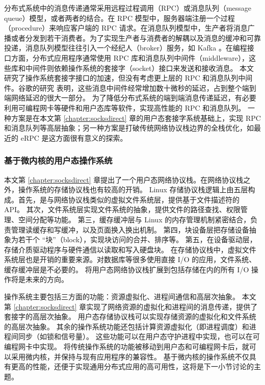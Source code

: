 分布式系统中的消息传递通常采用远程过程调用（RPC）或消息队列（message queue）模型，或者两者的结合。在 RPC 模型中，服务器端注册一个过程（procedure）来响应客户端的 RPC 请求。在消息队列模型中，生产者将消息广播或者分发到若干消费者。为了实现生产者与消费者的解耦以及消息的缓冲和可靠投递，消息队列模型往往引入一个经纪人（broker）服务，如 Kafka \cite{kreps2011kafka}。在编程接口方面，分布式应用程序通常使用 RPC 库和消息队列中间件（middleware），这些库和中间件则依赖操作系统的套接字（socket）接口来发送和接收消息。
本文研究了操作系统套接字接口的加速，但没有考虑更上层的 RPC 和消息队列中间件。谷歌的研究 \cite{barroso2017attack} 表明，这些消息中间件经常增加数十微秒的延迟，占到整个端到端网络延迟的很大一部分。
为了降低分布式系统的端到端消息传递延迟，有必要利用可编程网卡等硬件和用户态库等软件，实现高性能的 RPC 和消息队列。
一种方案是在本文第 \ref{chapter:socksdirect} 章的用户态套接字系统基础上，实现 RPC 和消息队列等高层抽象；另一种方案是打破传统网络协议栈边界的全栈优化，如最近的 eRPC \cite{kalia2018datacenter} 是这方面很有意义的探索。

\subsubsection{基于微内核的用户态操作系统}
\label{future:user-space-os}

本文第 \ref{chapter:socksdirect} 章提出了一个用户态网络协议栈。在网络协议栈之外，操作系统的存储协议栈也有较高的开销。
Linux 存储协议栈逻辑上由五层构成。首先，是与网络协议栈类似的虚拟文件系统层，提供基于文件描述符的 API。
其次，文件系统层实现文件系统的抽象，提供文件的路径查找、权限管理、空间分配等功能。
第三，缓存缓冲层与 Linux 的内存管理机制紧密结合，负责管理读缓存和写缓冲，以及页面换入换出机制。
第四，块设备层把存储设备抽象为若干个 ``块''（block），实现块访问的合并、排序等。
第五，在设备驱动层，存储介质驱动程序与硬件通信以读取和写入硬盘块。
在存储协议栈中，虚拟文件系统层也是开销的重要来源。对数据库等很多使用直接 I/O 的应用，文件系统、缓存缓冲层是不必要的。
将用户态网络协议栈扩展到包括存储在内的所有 I/O 操作将是未来的方向。

操作系统主要包括三方面的功能：资源虚拟化、进程间通信和高层次抽象。
本文第 \ref{chapter:socksdirect} 章实现了网络资源的虚拟化和进程间的消息传递，提供了套接字的高层次抽象。
用户态存储协议栈可以实现存储资源的虚拟化和文件系统的高层次抽象。
其余的操作系统功能还包括计算资源虚拟化（即进程调度）和进程间同步（如锁和信号量）。
这些功能可以在用户态守护进程中实现，也可以在可编程网卡中实现。
将传统操作系统的功能被移动到用户态和可编程网卡后，就可以采用微内核，并保持与现有应用程序的兼容性。
基于微内核的操作系统不仅具有更高的性能，还便于实现通用分布式应用的高可用性，这将是下一小节讨论的主题。

